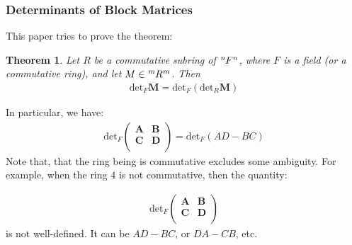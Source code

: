\documentclass{article}
\numberwithin{equation}{subsection} %
\newtheorem{thm}{Theorem}[section]
\theoremstyle{definition}
\begin{document}
        \subsubsection{Determinants of Block Matrices}
        \label{sec:Determinants of Block Matrices}
        
        This paper tries to prove the theorem:

        \begin{thm}
            Let $R$ be a commutative subring of $\tensor[^n]{F}{^n}$,
            where $F$ is a field (or a commutative ring), and let 
            $M\in \tensor[^m]{R}{^m}$. Then 
            \begin{align}
                \text{det}_F \mathbf{M} = 
                    \text{det}_F( \text{det}_R \mathbf{M})
            \end{align}
        \end{thm}
        
        In particular, we have:
        \begin{align}
            \text{det}_F \left(
                \begin{array}{cc}
                \mathbf{A} & \mathbf{B} \\
                \mathbf{C} & \mathbf{D} \\
                \end{array}
                \right)
                = \text{det}_F (AD-BC)
        \end{align}
        Note that, that the ring being is commutative excludes some
        ambiguity. For example, when the ring $4$ is not commutative,
        then the quantity:
        
        \begin{align}
            \text{det}_F \left(
                \begin{array}{cc}
                \mathbf{A} & \mathbf{B} \\
                \mathbf{C} & \mathbf{D} \\
                \end{array}
                \right)
        \end{align}
        is not well-defined. It can be $AD-BC$, or $DA-CB$, etc.
        
\end{document}
